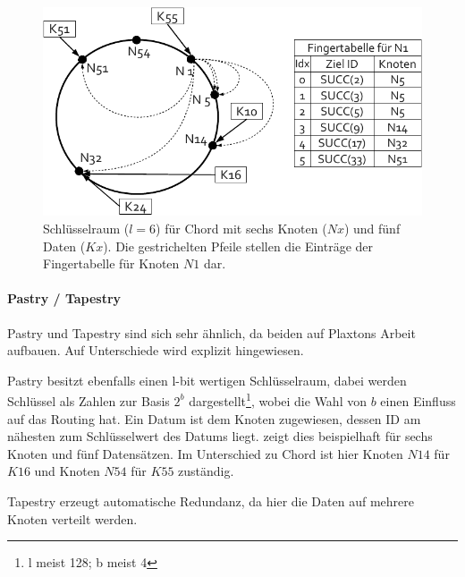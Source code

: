 \begin{figure}[htbp]
\centering
\includegraphics{grafics/chord_key_space.pdf}
\caption{Schlüsselraum ($l=6$) für Chord mit sechs Knoten ($Nx$) und fünf Daten ($Kx$). Die gestrichelten Pfeile stellen die Einträge der Fingertabelle für Knoten $N1$ dar.}
\label{fig:chord_key_space}
\end{figure}


\paragraph{Pastry / Tapestry}
Pastry \cite{Rowstron2001} und Tapestry \cite{Zhao2001Tapestry,Zhao2004Tapestry} sind sich sehr ähnlich, da beiden auf Plaxtons Arbeit \cite{Plaxton1997Accessing} aufbauen. Auf Unterschiede wird explizit hingewiesen.

Pastry besitzt ebenfalls einen l-bit wertigen Schlüsselraum, dabei werden Schlüssel als Zahlen zur Basis $2^b$ dargestellt\footnote{l meist 128; b meist 4}, wobei die Wahl von $b$ einen Einfluss auf das Routing hat. Ein Datum ist dem Knoten zugewiesen, dessen ID am nähesten zum Schlüsselwert des Datums liegt.   zeigt dies beispielhaft für sechs Knoten und fünf Datensätzen. Im Unterschied zu Chord ist hier Knoten $N14$ für $K16$ und Knoten $N54$ für $K55$ zuständig.\\

Tapestry erzeugt automatische Redundanz, da hier die Daten auf mehrere Knoten verteilt werden.

